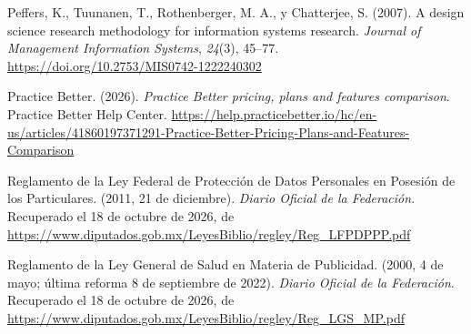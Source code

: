 \documentclass[12pt, a4paper]{article}
\begin{document}
\begin{list}{}{\setlength{\leftmargin}{1.27cm}\setlength{\itemindent}{-1.27cm}%
  \setlength{\labelwidth}{0pt}\setlength{\labelsep}{0pt}\setlength{\itemsep}{6pt}}
\item Peffers, K., Tuunanen, T., Rothenberger, M. A., y
  Chatterjee, S. (2007). A design science research methodology
  for information systems research. \textit{Journal of Management
  Information Systems}, \textit{24}(3), 45--77.
  \url{https://doi.org/10.2753/MIS0742-1222240302}



\item Practice Better. (2026). \textit{Practice Better pricing, plans and
  features comparison}. Practice Better Help Center.
  \url{https://help.practicebetter.io/hc/en-us/articles/41860197371291-Practice-Better-Pricing-Plans-and-Features-Comparison}
 

\item Reglamento de la Ley Federal de Protección de Datos
  Personales en Posesión de los Particulares. (2011,
  21 de diciembre). \textit{Diario Oficial de la Federación}. Recuperado el 18 de octubre de 2026, de \url{https://www.diputados.gob.mx/LeyesBiblio/regley/Reg_LFPDPPP.pdf}

  
  \item Reglamento de la Ley General de Salud en Materia de Publicidad.
    (2000, 4 de mayo; última reforma 8 de septiembre de 2022). \textit{Diario Oficial de la Federación}. Recuperado el 18 de octubre de 2026, de \url{https://www.diputados.gob.mx/LeyesBiblio/regley/Reg_LGS_MP.pdf}
 


\end{list}
\end{document}
